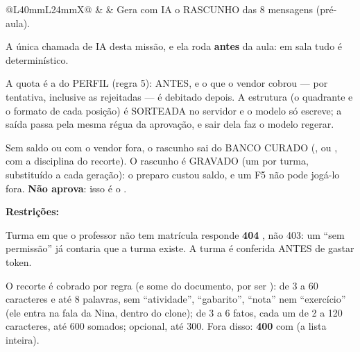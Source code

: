 \begin{tabularx}{\linewidth}{@{}L{40mm}L{24mm}X@{}}
 &  & Gera com IA o RASCUNHO das 8 mensagens (pré-aula).\par A única chamada de IA desta missão, e ela roda \textbf{antes} da aula: em sala tudo é determinístico.\par A quota é a do PERFIL (regra 5):  ANTES, e o que o vendor cobrou --- por tentativa, inclusive as rejeitadas --- é debitado depois. A estrutura (o quadrante e o formato de cada posição) é SORTEADA no servidor e o modelo só escreve; a saída passa pela mesma régua da aprovação, e sair dela faz o modelo regerar.\par Sem saldo ou com o vendor fora, o rascunho sai do BANCO CURADO (,   ou , com a disciplina do recorte). O rascunho é GRAVADO (um por turma, substituído a cada geração): o preparo custou saldo, e um F5 não pode jogá-lo fora. \textbf{Não aprova}: isso é o .\par \textbf{Restrições:}\par \hspace*{1em}\textbullet{} Turma em que o professor não tem matrícula responde \textbf{404} , não 403: um \enquote{sem permissão} já contaria que a turma existe. A turma é conferida ANTES de gastar token.\par \hspace*{1em}\textbullet{} O recorte é cobrado por regra (e some do documento, por ser ):  de 3 a 60 caracteres e até 8 palavras, sem \enquote{atividade}, \enquote{gabarito}, \enquote{nota} nem \enquote{exercício} (ele entra na fala da Nina, dentro do clone);  de 3 a 6 fatos, cada um de 2 a 120 caracteres, até 600 somados;  opcional, até 300. Fora disso: \textbf{400}  com  (a lista inteira).\\

\end{tabularx}
